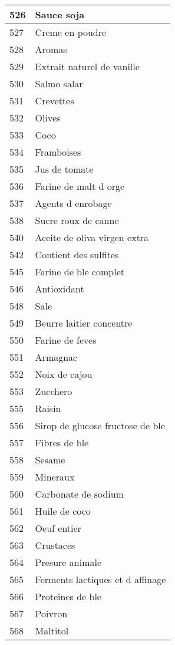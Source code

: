 \begin{longtable}{|l|l|}
526 & Sauce soja \\ \hline 
527 & Creme en poudre \\ \hline 
528 & Aromas \\ \hline 
529 & Extrait naturel de vanille \\ \hline 
530 & Salmo salar \\ \hline 
531 & Crevettes \\ \hline 
532 & Olives \\ \hline 
533 & Coco \\ \hline 
534 & Framboises \\ \hline 
535 & Jus de tomate \\ \hline 
536 & Farine de malt d orge \\ \hline 
537 & Agents d enrobage \\ \hline 
538 & Sucre roux de canne \\ \hline 
540 & Aceite de oliva virgen extra \\ \hline 
542 & Contient des sulfites \\ \hline 
545 & Farine de ble complet \\ \hline 
546 & Antioxidant \\ \hline 
548 & Sale \\ \hline 
549 & Beurre laitier concentre \\ \hline 
550 & Farine de feves \\ \hline 
551 & Armagnac \\ \hline 
552 & Noix de cajou \\ \hline 
553 & Zucchero \\ \hline 
555 & Raisin \\ \hline 
556 & Sirop de glucose fructose de ble \\ \hline 
557 & Fibres de ble \\ \hline 
558 & Sesame \\ \hline 
559 & Mineraux \\ \hline 
560 & Carbonate de sodium \\ \hline 
561 & Huile de coco \\ \hline 
562 & Oeuf entier \\ \hline 
563 & Crustaces \\ \hline 
564 & Presure animale \\ \hline 
565 & Ferments lactiques et d affinage \\ \hline 
566 & Proteines de ble \\ \hline 
567 & Poivron \\ \hline 
568 & Maltitol \\ \hline 

\end{longtable}
